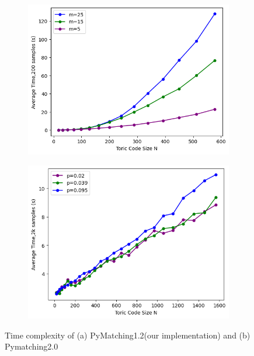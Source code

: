 \documentclass[
    a4paper, %
    10pt, %
    unnumberedsections, %
    twoside, %
]{LTJournalArticle}
\begin{document}
    \begin{figure}[htbp] %
        \centering %
        \vspace{0cm} %
        \setlength{\abovecaptionskip}{0.cm} %
        \setlength{\belowcaptionskip}{0.cm} %
        \setlength{\belowdisplayskip}{3pt} %
        \begin{subfigure}[b]{0.9\linewidth}
            \includegraphics[width=\linewidth]{img/timespend_ours.png}
            \caption{}
            \label{fig:time1}
        \end{subfigure}
        \hfill
        \begin{subfigure}[b]{0.9\linewidth}
            \includegraphics[width=\linewidth]{img/timespend_pymatch.png}
            \caption{}
            \label{fig:time2}
        \end{subfigure}
        \caption{Time complexity of (a) PyMatching1.2(our implementation) and (b) Pymatching2.0}
    \end{figure}
\end{document}
